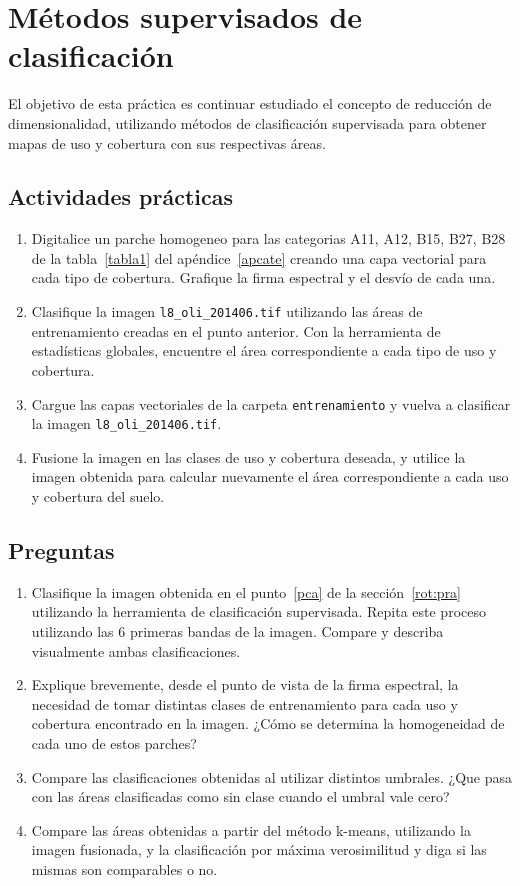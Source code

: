 \documentclass[hidelinks,12pt]{article}
\begin{document}
\newpage
\section{Métodos supervisados de clasificación}
El objetivo de esta práctica es continuar estudiado el concepto de reducción de 
dimensionalidad, utilizando métodos de clasificación supervisada para obtener 
mapas de uso y cobertura con sus respectivas áreas. 

\subsection{Actividades pr\'acticas}
\begin{enumerate}
    \item Digitalice un parche homogeneo  para las categorias A11, A12, B15, B27, B28 de la 
    tabla~\ref{tabla1} del ap\'endice~\ref{apcate} creando una capa vectorial para 
    cada tipo de cobertura. Grafique la firma espectral y el desvío de cada una. 
    \item Clasifique la imagen \texttt{l8\_oli\_2014\-06.tif} utilizando las
    áreas de entrenamiento creadas en el punto anterior. Con la herramienta
    de estadísticas globales, encuentre el área correspondiente a cada tipo de uso y
    cobertura.
    \item Cargue las capas vectoriales de la carpeta \texttt{entrenamiento} y
        vuelva a clasificar la imagen \texttt{l8\_oli\_2014\-06.tif}.
    \item Fusione la imagen en las clases de uso y cobertura deseada, y utilice la
    imagen obtenida para calcular nuevamente el área correspondiente a cada uso y
    cobertura del suelo. 
\end{enumerate}

\subsection{Preguntas}
\begin{enumerate}
    \item Clasifique la imagen obtenida en el punto~\ref{pca} de la secci\'on~\ref{rot:pra}
        utilizando la herramienta de clasificación supervisada.
        Repita este proceso utilizando las 6 primeras bandas de la imagen. 
        Compare y describa visualmente ambas clasificaciones.
    \item Explique brevemente, desde el punto de vista de la firma espectral, la
        necesidad de tomar distintas clases de entrenamiento para cada uso y
        cobertura encontrado en la imagen. ¿Cómo se determina la homogeneidad de
        cada uno de estos parches?
    \item Compare las clasificaciones obtenidas al utilizar distintos umbrales. 
        ¿Que pasa con las \'areas clasificadas como sin clase cuando el umbral
        vale cero?
    \item Compare las áreas obtenidas a partir del método k-means, utilizando la
        imagen fusionada, y la clasificación por máxima verosimilitud y diga si
        las mismas son comparables o no.
\end{enumerate}
\end{document}
